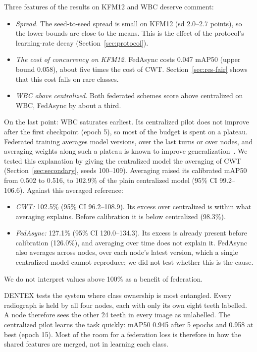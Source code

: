 \documentclass[pdflatex,sn-mathphys-num]{sn-jnl}
\begin{document}
Three features of the results on KFM12 and WBC deserve comment:
\begin{itemize}
\item \emph{Spread.} The seed-to-seed spread is small on KFM12 (sd 2.0--2.7 points), so the lower bounds are close to the means. This is the effect of the protocol's learning-rate decay (Section~\ref{sec:protocol}).
\item \emph{The cost of concurrency on KFM12.} FedAsync costs 0.047 mAP50 (upper bound 0.058), about five times the cost of CWT. Section~\ref{sec:res-fair} shows that this cost falls on rare classes.
\item \emph{WBC above centralized.} Both federated schemes score above centralized on WBC, FedAsync by about a third.
\end{itemize}
On the last point: WBC saturates earliest. Its centralized pilot does not improve after the first checkpoint (epoch 5), so most of the budget is spent on a plateau. Federated training averages model versions, over the last turns or over nodes, and averaging weights along such a plateau is known to improve generalization~\cite{izmailov2018swa}. We tested this explanation by giving the centralized model the averaging of CWT (Section~\ref{sec:secondary}, seeds 100--109). Averaging raised its calibrated mAP50 from 0.502 to 0.516, to 102.9\% of the plain centralized model (95\% CI 99.2--106.6). Against this averaged reference:
\begin{itemize}
\item \emph{CWT:} 102.5\% (95\% CI 96.2--108.9). Its excess over centralized is within what averaging explains. Before calibration it is below centralized (98.3\%).
\item \emph{FedAsync:} 127.1\% (95\% CI 120.0--134.3). Its excess is already present before calibration (126.0\%), and averaging over time does not explain it. FedAsync also averages across nodes, over each node's latest version, which a single centralized model cannot reproduce; we did not test whether this is the cause.
\end{itemize}
We do not interpret values above 100\% as a benefit of federation.

DENTEX tests the system where class ownership is most entangled. Every radiograph is held by all four nodes, each with only its own eight teeth labelled. A node therefore sees the other 24 teeth in every image as unlabelled. The centralized pilot learns the task quickly: mAP50 0.945 after 5 epochs and 0.958 at best (epoch 15). Most of the room for a federation loss is therefore in how the shared features are merged, not in learning each class.
\end{document}
